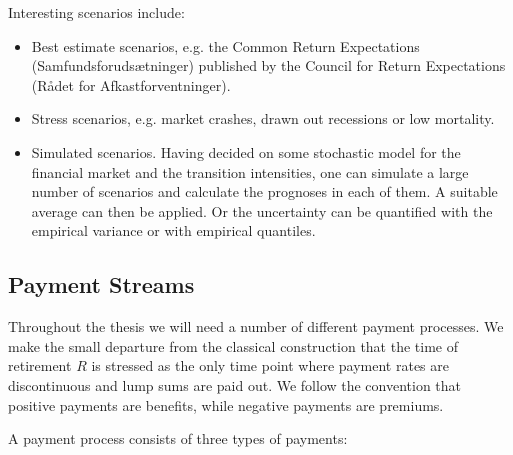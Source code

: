 \documentclass{article}
\newcommand{\1}[1]{\mathbbm{1}_{\left\lbrace #1 \right\rbrace}}
\theoremstyle{break}
\theoremstyle{remark}
\numberwithin{equation}{section}
\begin{document}
Interesting scenarios include:

\begin{itemize}
	\item Best estimate scenarios, e.g. the Common Return Expectations (Samfundsforudsætninger) published by the Council for Return Expectations (Rådet for Afkastforventninger).
	\item Stress scenarios, e.g. market crashes, drawn out recessions or low mortality.
	\item Simulated scenarios. Having decided on some stochastic model for the financial market and the transition intensities, one can simulate a large number of scenarios and calculate the prognoses in each of them. A suitable average can then be applied. Or the uncertainty can be quantified with the empirical variance or with empirical quantiles.
\end{itemize}

\subsection{Payment Streams} \label{PayStreams}

Throughout the thesis we will need a number of different payment processes. We make the small departure from the classical construction that the time of retirement $R$ is stressed as the only time point where payment rates are discontinuous and lump sums are paid out. We follow the convention that positive payments are benefits, while negative payments are premiums.

A payment process consists of three types of payments:
\end{document}
